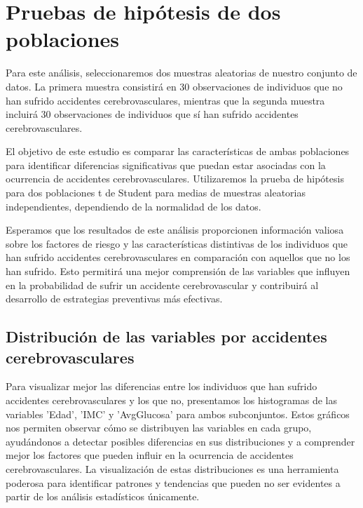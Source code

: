 \documentclass[a4paper, 12pt]{article}
\begin{document}

\newpage


\section{Pruebas de hipótesis de dos poblaciones}
Para este análisis, seleccionaremos dos muestras aleatorias de nuestro conjunto de datos. La primera muestra consistirá en 30 observaciones de individuos que no han sufrido accidentes cerebrovasculares, mientras que la segunda muestra incluirá 30 observaciones de individuos que sí han sufrido accidentes cerebrovasculares. 

El objetivo de este estudio es comparar las características de ambas poblaciones para identificar diferencias significativas que puedan estar asociadas con la ocurrencia de accidentes cerebrovasculares. Utilizaremos la prueba de hipótesis para dos poblaciones t de Student para medias de muestras aleatorias independientes, dependiendo de la normalidad de los datos.

Esperamos que los resultados de este análisis proporcionen información valiosa sobre los factores de riesgo y las características distintivas de los individuos que han sufrido accidentes cerebrovasculares en comparación con aquellos que no los han sufrido. Esto permitirá una mejor comprensión de las variables que influyen en la probabilidad de sufrir un accidente cerebrovascular y contribuirá al desarrollo de estrategias preventivas más efectivas.

\subsection{Distribución de las variables por accidentes cerebrovasculares}
Para visualizar mejor las diferencias entre los individuos que han sufrido accidentes cerebrovasculares y los que no, presentamos los histogramas de las variables 'Edad', 'IMC' y 'AvgGlucosa' para ambos subconjuntos. Estos gráficos nos permiten observar cómo se distribuyen las variables en cada grupo, ayudándonos a detectar posibles diferencias en sus distribuciones y a comprender mejor los factores que pueden influir en la ocurrencia de accidentes cerebrovasculares. La visualización de estas distribuciones es una herramienta poderosa para identificar patrones y tendencias que pueden no ser evidentes a partir de los análisis estadísticos únicamente.
\end{document}
